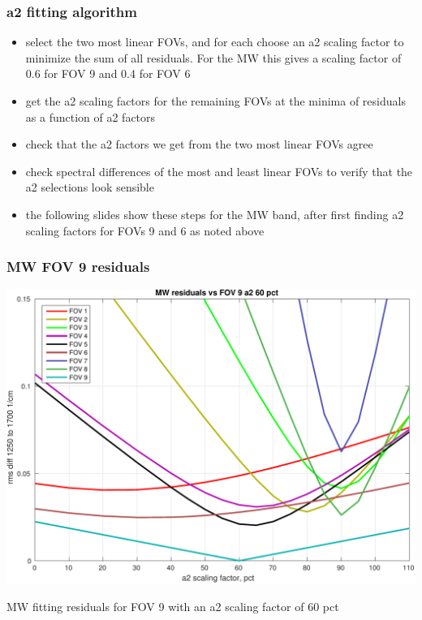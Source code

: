 \documentclass[11pt]{beamer}
\begin{document}
\begin{frame}
\frametitle{a2 fitting algorithm}

\begin{itemize}

  \item select the two most linear FOVs, and for each choose an a2
    scaling factor to minimize the sum of all residuals.  For the MW
    this gives a scaling factor of 0.6 for FOV 9 and 0.4 for FOV 6

  \item get the a2 scaling factors for the remaining FOVs at the
    minima of residuals as a function of a2 factors

  \item check that the a2 factors we get from the two most linear
    FOVs agree

  \item check spectral differences of the most and least linear FOVs
    to verify that the a2 selections look sensible

  \item the following slides show these steps for the {\cris} MW
    band, after first finding a2 scaling factors for FOVs 9 and 6 as
    noted above

\end{itemize}

\end{frame}
\begin{frame}
\frametitle{MW FOV 9 residuals}
\begin{center}
  \includegraphics[scale=0.5]{figures/MW_resids_FOV_9_a2_60.pdf}
\end{center}
\begin{center}
  MW fitting residuals for FOV 9 with an a2 scaling factor of 60 pct
\end{center}
\end{frame}
\end{document}
